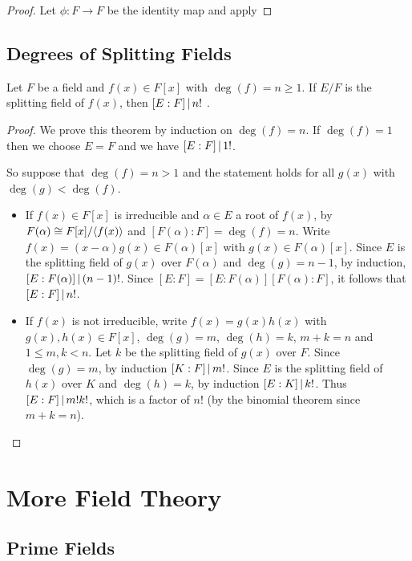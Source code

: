\documentclass[11pt]{article}
\begin{document}
\begin{proof}
    Let $\phi:F\to F$ be the identity map and apply 
    
\end{proof}

\subsection{Degrees of Splitting Fields}

\begin{theorem}
    Let $F$ be a field and $f(x)\in F[x]$ with $\deg(f)=n\geq1$. If $E/F$ is the splitting field of $f(x)$, then $[E:F]\,|\, n!$ .
\end{theorem}

\begin{proof}
    We prove this theorem by induction on $\deg(f)=n$. If $\deg(f)=1$ then we choose $E=F$ and we have $[E:F]\,|\, 1!$.

    So suppose that $\deg(f)=n>1$ and the statement holds for all $g(x)$ with $\deg(g)<\deg(f)$.
    \begin{itemize}
        \item If $f(x)\in F[x]$ is irreducible and $\alpha\in E$ a root of $f(x)$, by  $F(\alpha)\cong F[x]/\langle f(x)\rangle$ and $[F(\alpha):F]=\deg(f)=n$. Write $f(x)=(x-\alpha)g(x)\in F(\alpha)[x]$ with $g(x)\in F(\alpha)[x]$. Since $E$ is the splitting field of $g(x)$ over $F(\alpha)$ and $\deg(g)=n-1$, by induction, $[E:F(\alpha)]\,|\, (n-1)!$. Since $[E:F]=[E:F(\alpha)][F(\alpha):F]$, it follows that $[E:F]\,|\, n!$.

        \item If $f(x)$ is not irreducible, write $f(x)=g(x)h(x)$ with $g(x),h(x)\in F[x]$, $\deg(g)=m$, $\deg(h)=k$, $m+k=n$ and $1\leq m,k<n$. Let $k$ be the splitting field of $g(x)$ over $F$. Since $\deg(g)=m$, by induction $[K:F]\,|\, m!$. Since $E$ is the splitting field of $h(x)$ over $K$ and $\deg(h)=k$, by induction $[E:K]\,|\, k!$. Thus $[E:F]\,|\, m!k!$, which is a factor of $n!$ (by the binomial theorem since $m+k=n$).
    \end{itemize}
\end{proof}

\pagebreak

\section{More Field Theory}

\subsection{Prime Fields}
\end{document}
